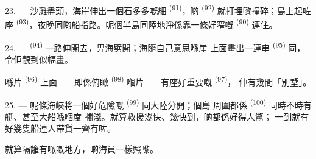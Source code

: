 23. --- 沙灘盡頭，海岸伸出一個石多多嘅細 \textsuperscript{(91)}，啲
 \textsuperscript{(92)} 就打埋嚟撞碎；島上起咗座
\textsuperscript{(93)}，夜晚同啲船指路。呢個半島同陸地淨係靠一條好窄嘅
\textsuperscript{(90)} 連住。

\VUsaut{3.0mm}
\VUsaut{3.0mm}

24. ---  \textsuperscript{(94)} 一路伸開去，畀海劈開；海隨自己意思喺崖
上面畫出一連串 \textsuperscript{(95)} 同，令佢靚到似幅畫。

喺片 \textsuperscript{(96)} 上面——即係俯瞰
\textsuperscript{(98)} 嗰片——有座好重要嘅 \textsuperscript{(97)}，
仲有幾間「別墅」。

25. --- 呢條海峽將一個好危險嘅 \textsuperscript{(99)} 同大陸分開；個島
周圍都係 \textsuperscript{(100)} 同時不時有艇、甚至大船喺嗰度
擱淺。就算救援幾快、幾快到，啲都係好得人驚；
一到就有好幾隻船連人帶貨一齊冇咗。

就算隔籬有噉嘅地方，啲海員一樣照嚟。

\VUsaut{6.0mm}
\VUfilet{22mm}
